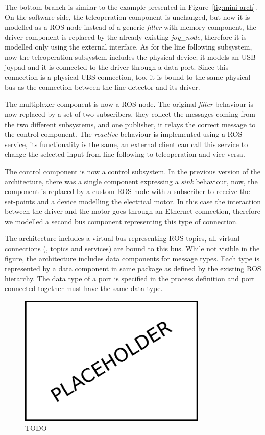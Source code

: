 The bottom branch is similar to the example presented in Figure~\ref{fig:mini-arch}. On the software side, the teleoperation component is unchanged, but now it is modelled as a ROS node instead of a generic \textit{filter} with memory component, the driver component is replaced by the already existing \textit{joy\_node}, therefore it is modelled only using the external interface. As for the line following subsystem, now the teleoperation subsystem includes the physical device; it models an USB joypad and it is connected to the driver through a data port. Since this connection is a physical UBS connection, too, it is bound to the same physical bus as the connection between the line detector and its driver.

The multiplexer component is now a ROS node. The original \textit{filter} behaviour is now replaced by a set of two subscribers, they collect the messages coming from the two different subsystems, and one publisher, it relays the correct message to the control component. The \textit{reactive} behaviour is implemented using a ROS service, its functionality is the same, an external client can call this service to change the selected input from line following to teleoperation and vice versa.

The control component is now a control subsystem. In the previous version of the architecture, there was a single component expressing a \textit{sink} behaviour, now, the component is replaced by a custom ROS node with a subscriber to receive the set-points and a device modelling the electrical motor. In this case the interaction between the driver and the motor goes through an Ethernet connection, therefore we modelled a second bus component representing this type of connection.

The architecture includes a virtual bus representing ROS topics, all virtual connections (\ie, topics and services) are bound to this bus. While not visible in the figure, the architecture includes data components for message types. Each type is represented by a data component in same package as defined by the existing ROS hierarchy. The data  type of a port is specified in the process definition and port connected together must have the same data type.

\begin{figure}[t]
    \centering
    \includegraphics[width=0.8\textwidth]{gfx/placeholder}
    \caption{TODO}\label{fig:template}
\end{figure}

